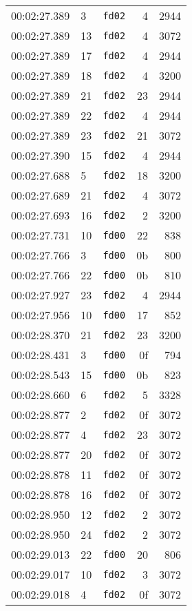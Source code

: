 \documentclass{article}
\begin{document}
\begin{longtable}{lllrr}
00:02:27.389 & 3 & \texttt{fd02} & 4 & 2944 \\
00:02:27.389 & 13 & \texttt{fd02} & 4 & 3072 \\
00:02:27.389 & 17 & \texttt{fd02} & 4 & 2944 \\
00:02:27.389 & 18 & \texttt{fd02} & 4 & 3200 \\
00:02:27.389 & 21 & \texttt{fd02} & 23 & 2944 \\
00:02:27.389 & 22 & \texttt{fd02} & 4 & 2944 \\
00:02:27.389 & 23 & \texttt{fd02} & 21 & 3072 \\
00:02:27.390 & 15 & \texttt{fd02} & 4 & 2944 \\
00:02:27.688 & 5 & \texttt{fd02} & 18 & 3200 \\
00:02:27.689 & 21 & \texttt{fd02} & 4 & 3072 \\
00:02:27.693 & 16 & \texttt{fd02} & 2 & 3200 \\
00:02:27.731 & 10 & \texttt{fd00} & 22 & 838 \\
00:02:27.766 & 3 & \texttt{fd00} & 0b & 800 \\
00:02:27.766 & 22 & \texttt{fd00} & 0b & 810 \\
00:02:27.927 & 23 & \texttt{fd02} & 4 & 2944 \\
00:02:27.956 & 10 & \texttt{fd00} & 17 & 852 \\
00:02:28.370 & 21 & \texttt{fd02} & 23 & 3200 \\
00:02:28.431 & 3 & \texttt{fd00} & 0f & 794 \\
00:02:28.543 & 15 & \texttt{fd00} & 0b & 823 \\
00:02:28.660 & 6 & \texttt{fd02} & 5 & 3328 \\
00:02:28.877 & 2 & \texttt{fd02} & 0f & 3072 \\
00:02:28.877 & 4 & \texttt{fd02} & 23 & 3072 \\
00:02:28.877 & 20 & \texttt{fd02} & 0f & 3072 \\
00:02:28.878 & 11 & \texttt{fd02} & 0f & 3072 \\
00:02:28.878 & 16 & \texttt{fd02} & 0f & 3072 \\
00:02:28.950 & 12 & \texttt{fd02} & 2 & 3072 \\
00:02:28.950 & 24 & \texttt{fd02} & 2 & 3072 \\
00:02:29.013 & 22 & \texttt{fd00} & 20 & 806 \\
00:02:29.017 & 10 & \texttt{fd02} & 3 & 3072 \\
00:02:29.018 & 4 & \texttt{fd02} & 0f & 3072 \\

\end{longtable}
\end{document}
